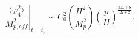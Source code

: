 \begin{equation}
\left. \frac{\langle \varphi_4^2  \rangle}{M_{p,eff}^2}
\right \vert_{t=t_p} \sim 
C_0^2 \left( \frac{H^2}{M_p^2} \right) 
\left( \frac{p}{H} \right)^{\frac{3 \Delta+8}{\Delta+2}}.
\end{equation}

